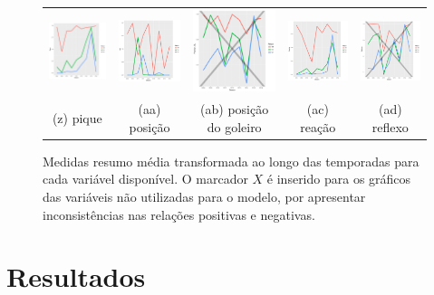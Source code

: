 \documentclass[review]{elsarticle}
\begin{document}
\begin{figure}
\begin{tabular}{ccccc}
    \includegraphics[width=25mm]{pique_result_trans_media}  & \includegraphics[width=25mm]{pos_result_trans_media} & \includegraphics[width=25mm]{posicion_gl_result_trans_media} &     \includegraphics[width=25mm]{reacao_result_trans_media}&
  \includegraphics[width=25mm]{reflexos_result_trans_media}     \\
 \scriptsize{(z) pique} & \scriptsize{(aa) posição}& \scriptsize{(ab) posição do goleiro} & \scriptsize{(ac) reação} & \scriptsize{(ad) reflexo}  \\[3pt]

\end{tabular}
    \caption[\scriptsize{Medidas resumo transformado na média.}]{\scriptsize{Medidas resumo média transformada ao longo das temporadas para cada variável disponível. O marcador $X$ é inserido para os gráficos das variáveis não utilizadas para o modelo, por apresentar inconsistências nas relações positivas e negativas.}}
    \label{fig:medresumotransmedia}
\end{figure}



\section{Resultados}
\label{sec:reslt}
\end{document}
